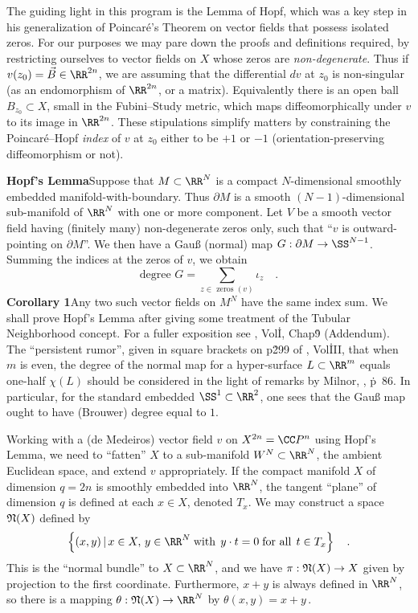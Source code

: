 The guiding light in this program is the Lemma of Hopf, which was a key step in his generalization of Poincar\'e's Theorem on vector fields that possess isolated zeros. For our purposes we may pare down the proofs and definitions required, by restricting ourselves to vector fields on $X$ whose zeros are {\it non-degenerate}. Thus if $v(z_0) = \vec{B} \in \RR^{2n}$, we are assuming that the differential $dv$ at $z_0$ is non-singular (as an endomorphism of $\RR^{2n}$, or a matrix). Equivalently there is an open ball $B_{z_0} \subset X$, small in the Fubini--Study metric, which maps diffeomorphically under $v$ to its image in $\RR^{2n}$. These stipulations simplify matters by constraining the Poincar\'e--Hopf {\it index} of $v$ at $z_0$ either to be $+1$ or $- 1$ (orientation-preserving diffeomorphism or not).

\bigskip
\noindent
{\bf Hopf\rq s Lemma}\quad Suppose that $M \subset \RR^N$ is a compact $N$-dimensional smoothly embedded manifold-with-boundary. Thus $\partial M$ is a smooth $(N-1)$-dimensional sub-manifold of $\RR^N$ with one or more component. Let $V$ be a smooth vector field having (finitely many) non-degenerate zeros only, such that ``$v$ is outward-pointing on $\partial M$''. We then have a Gau{\ss} (normal) map $G: \partial M \to \SS^{N-1}$. Summing the indices at the zeros of $v$, we obtain
$$\mbox{degree $G$} = \sum_{\text{$z \in$  zeros $(v)$}} \iota_z\quad .$$
\bigskip
\noindent
{\bf Corollary 1}\quad Any two such vector fields on $M^N$ have the same index sum.
\bigskip
We shall prove Hopf's Lemma after giving some treatment of the Tubular Neighborhood concept. For a fuller exposition see \cite{Spivak}, Vol\. I, Chap\. 9 (Addendum). The ``persistent rumor'', given in square brackets on p\. 299 of \cite{Spivak}, Vol\. III, that when $m$ is even, the degree of the normal map for a hyper-surface $L \subset \RR^m$ equals one-half $\chi(L)$ should be considered in the light of remarks by Milnor, \cite{TFDV}, p\.~86. In particular, for the standard embedded $\SS^1 \subset \RR^2$, one sees that the Gau{\ss} map ought to have (Brouwer) degree equal to $1$.

Working with a (de Medeiros) vector field $v$ on $X^{2n} = \CC P^n$ using Hopf's Lemma, we need to ``fatten'' $X$ to a sub-manifold $W^N\subset \RR^N$, the ambient Euclidean space, and extend $v$ appropriately.
If the compact manifold $X$ of dimension $q = 2n$ is smoothly embedded into $\RR^N$, the tangent ``plane'' of dimension $q$ is defined at each $x \in X$, denoted $T_x$. We may construct a space $\frak N(X)$ defined by
$$\left\{(x, y)\,|\, x \in X,\, y \in \RR^N\;\text{with}\,\;y \cdot t = 0\;\text{for all}\,\;t \in T_x\right\}\quad .$$
This is the ``normal bundle'' to $X \subset \RR^N$, and we have
$\pi : \frak N(X) \to X$ given by projection to the first coordinate. Furthermore, $x + y$ is always defined in $\RR^N$, so there is a mapping $\theta: \frak N(X) \to \RR^N$ by $\theta (x, y) = x+y\,$.

